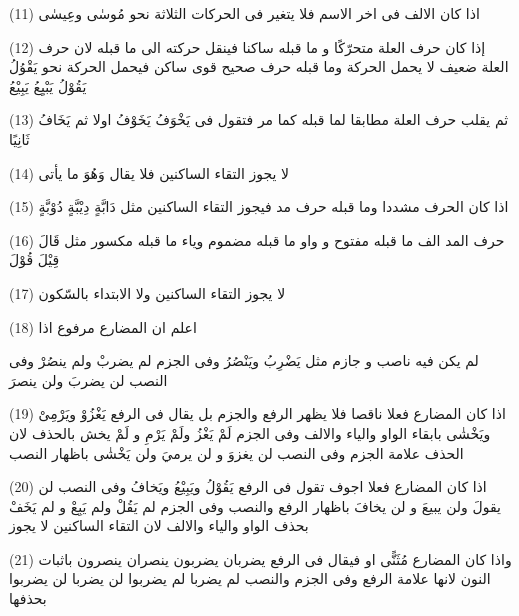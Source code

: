 \begin{twocol}
\begin{rightcol}
(11) اذا كان الالف فى اخر الاسم فلا يتغير فى الحركات الثلاثة نحو مُوسٰى وعِيسٰى
\par
(12) إذا كان حرف العلة متحرّكًا و ما قبله ساكنا فينقل حركته الى ما قبله لان حرف العلة ضعيف لا يحمل الحركة وما قبله حرف صحيح قوى ساكن فيحمل الحركة نحو يَقْوُلُ يَقُوْلُ يَبْيِعُ يَبِيْعُ
\par
(13) ثم يقلب حرف العلة مطابقا لما قبله كما مر فتقول فى يَخْوَفُ يَخَوْفُ اولا ثم يَخَافُ ثَانِيًا
\par
(14) لا يجوز التقاء الساكنين فلا يقال  وَهُوَ ما يأتى
\par
(15) اذا كان الحرف مشددا وما قبله حرف مد فيجوز التقاء الساكنين مثل دَابَّةٍ دِيْبَّةٍ دُوْبَّةٍ
\par
(16) حرف المد الف ما قبله مفتوح و واو ما قبله مضموم وياء ما قبله مكسور مثل قَالَ قِيْلَ قُوْلَ
\par
(17) لا يجوز التقاء الساكنين ولا الابتداء بالسّكون
\par
(18) اعلم ان المضارع مرفوع اذا
\end{rightcol}
\begin{leftcol}
لم يكن فيه ناصب و جازم مثل يَضْرِبُ ويَنْصُرُ وفى الجزم لم يضربْ ولم ينصُرْ وفى النصب لن يضربَ ولن ينصرَ
\par
(19) اذا كان المضارع فعلا ناقصا فلا يظهر الرفع والجزم بل يقال فى الرفع يَغْزُوْ ويَرْمِىْ ويَخْشٰى بابقاء الواو والياء والالف وفى الجزم لَمْ يَغْزُ ولَمْ يَرْمِ و لَمْ يخش بالحذف لان الحذف علامة الجزم وفى النصب لن يغزوَ و لن يرميَ ولن يَخْشٰى باظهار النصب
\par
(20) اذا كان المضارع فعلا اجوف تقول فى الرفع يَقُوْلُ ويَبِيْعُ ويَخافُ وفى النصب لن يقولَ ولن يبيعَ و لن يخافَ باظهار الرفع والنصب وفى الجزم لم يَقُلْ ولم يَبِعْ و لم يَخَفْ بحذف الواو والياء والالف لان التقاء الساكنين لا يجوز
\par
(21) واذا كان المضارع مُثَنًّى او  فيقال فى الرفع يضربان يضربون ينصران ينصرون باثبات النون لانها علامة الرفع وفى الجزم والنصب لم يضربا لم يضربوا لن يضربا لن يضربوا بحذفها
\end{leftcol}
\end{twocol}

